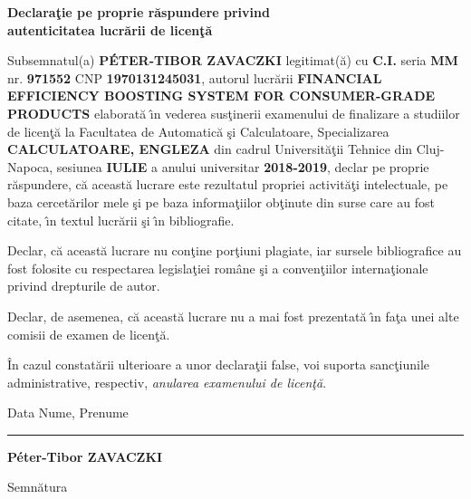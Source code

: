 \documentclass[12pt,a4paper,twoside]{report}
\renewcommand{\thesisauthor}{Péter-Tibor ZAVACZKI}    %
\renewcommand{\thesistitle}{FINANCIAL EFFICIENCY BOOSTING SYSTEM FOR CONSUMER-GRADE PRODUCTS}
\newcommand{\uline}[1]{\rule[0pt]{#1}{0.4pt}}
\begin{document}
\vspace{0.5cm}

\begin{center}
  {\bf
    Declara\c{t}ie pe proprie r\u{a}spundere privind\\
    autenticitatea lucr\u{a}rii de licen\c{t}\u{a}}
\end{center}
\vspace{1cm}



Subsemnatul(a) \textbf{PÉTER-TIBOR ZAVACZKI} legitimat(\u{a}) cu \textbf{C.I.} seria \textbf{MM} nr. \textbf{971552} CNP \textbf{1970131245031}, autorul lucr\u{a}rii \textbf{\thesistitle}
elaborat\u{a} \^{\i}n vederea sus\c{t}inerii examenului de finalizare a studiilor de licen\c{t}\u{a} la Facultatea de Automatic\u{a} \c{s}i Calculatoare, Specializarea \textbf{CALCULATOARE, ENGLEZA} din cadrul Universit\u{a}\c{t}ii Tehnice din Cluj-Napoca, sesiunea \textbf{IULIE} a anului universitar \textbf{2018-2019}, declar pe proprie r\u{a}spundere, c\u{a} aceast\u{a} lucrare este rezultatul propriei activit\u{a}\c{t}i intelectuale, pe baza cercet\u{a}rilor mele \c{s}i pe baza informa\c{t}iilor ob\c{t}inute din surse care au fost citate, \^{\i}n textul lucr\u{a}rii \c{s}i \^{\i}n bibliografie.

Declar, c\u{a} aceast\u{a} lucrare nu con\c{t}ine por\c{t}iuni plagiate, iar sursele bibliografice au fost folosite cu
respectarea legisla\c{t}iei rom\^{a}ne \c{s}i a conven\c{t}iilor interna\c{t}ionale privind drepturile de autor.

Declar, de asemenea, c\u{a} aceast\u{a} lucrare nu a mai fost prezentat\u{a} \^{\i}n fa\c{t}a unei alte comisii de examen de licen\c{t}\u{a}.

\^{I}n cazul constat\u{a}rii ulterioare a unor declara\c{t}ii false, voi suporta sanc\c{t}iunile administrative, respectiv, \emph{anularea examenului de licen\c{t}\u{a}}.

\vspace{1.5cm}

Data \hspace{8cm} Nume, Prenume

\vspace{0.5cm}

\uline{3cm} \hspace{5cm} \textbf{\thesisauthor}

\vspace{0.5cm}
\hspace{9.4cm}Semn\u{a}tura

\thispagestyle{empty}
\newpage
$ $
\thispagestyle{empty}
\newpage
\end{document}
